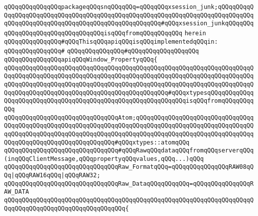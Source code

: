 \verb|qQQqqQQqqQQqqQQqpackageqQQqsnqQQqqQQq=qQQqqQQqxsession_junk;qQQqqQQqqQQqqQQqqQQqqQQqqQQqqQQqqQQqqQQqqQQqqQQqqQQqqQQqqQQqqQQqqQQqqQQqqQQqqQQqqQQqqQQqqQQqqQQqqQQqqQQqqQQqqQQqqQQqqQQqqQQq#qQQqxsession_junkqQQqqQQqqQQqqQQqqQQqqQQqqQQqqQQqqQQqisqQQqfromqQQqqQQqqQQq|\newline
\verb|herein|\newline
\newline
\verb|qQQqqQQqqQQqqQQq#qQQqThisqQQqapiqQQqisqQQqimplementedqQQqin:|\newline
\verb|qQQqqQQqqQQqqQQq#|\newline
\verb|qQQqqQQqqQQqqQQq#qQQqqQQqqQQqqQQqqQQq|\newline
\newline
\verb|qQQqqQQqqQQqqQQqapiqQQqWindow_PropertyqQQq{|\newline
\verb|qQQqqQQqqQQqqQQqqQQqqQQqqQQqqQQqqQQqqQQqqQQqqQQqqQQqqQQqqQQqqQQqqQQqqQQqqQQqqQQqqQQqqQQqqQQqqQQqqQQqqQQqqQQqqQQqqQQqqQQqqQQqqQQqqQQqqQQqqQQqqQQqqQQqqQQqqQQqqQQqqQQqqQQqqQQqqQQqqQQqqQQqqQQqqQQqqQQqqQQqqQQqqQQqqQQqqQQqqQQqqQQqqQQqqQQqqQQqqQQqqQQqqQQqqQQqqQQq#qQQqxtypesqQQqqQQqqQQqqQQqqQQqqQQqqQQqqQQqqQQqqQQqqQQqqQQqqQQqqQQqqQQqqQQqisqQQqfromqQQqqQQqqQQq|\newline
\newline
\verb|qQQqqQQqqQQqqQQqqQQqqQQqqQQqqQQqAtom;qQQqqQQqqQQqqQQqqQQqqQQqqQQqqQQqqQQqqQQqqQQqqQQqqQQqqQQqqQQqqQQqqQQqqQQqqQQqqQQqqQQqqQQqqQQqqQQqqQQqqQQqqQQqqQQqqQQqqQQqqQQqqQQqqQQqqQQqqQQqqQQqqQQqqQQqqQQqqQQqqQQqqQQqqQQqqQQqqQQqqQQqqQQqqQQqqQQqqQQqqQQq#qQQqxtypes::atomqQQq|\newline
\newline
\verb|qQQqqQQqqQQqqQQqqQQqqQQqqQQqqQQq#qQQqRawqQQqdataqQQqfromqQQqserverqQQq(inqQQqClientMessage,qQQqpropertyqQQqvalues,qQQq...)qQQq|\newline
\newline
\verb|qQQqqQQqqQQqqQQqqQQqqQQqqQQqqQQqRaw_FormatqQQq=qQQqqQQqqQQqqQQqRAW08qQQq|\verb#|qQQqRAW16qQQq|qQQqRAW32;#\newline
\newline
\verb|qQQqqQQqqQQqqQQqqQQqqQQqqQQqqQQqRaw_DataqQQqqQQqqQQq=qQQqqQQqqQQqqQQqRAW_DATA|\newline
\verb|qQQqqQQqqQQqqQQqqQQqqQQqqQQqqQQqqQQqqQQqqQQqqQQqqQQqqQQqqQQqqQQqqQQqqQQqqQQqqQQqqQQqqQQqqQQqqQQqqQQqqQQq{|\newline
